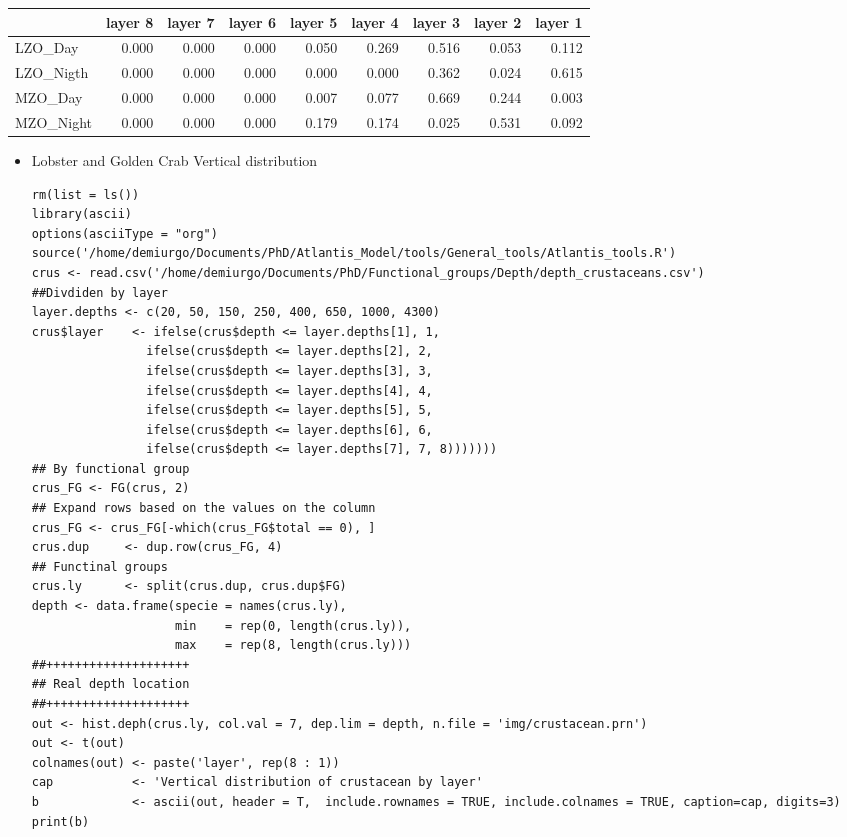 \documentclass[11pt]{article}
\begin{document}
\begin{itemize}
\begin{itemize}
\begin{itemize}
\begin{center}
\begin{tabular}{lrrrrrrrr}
            &  layer 8  &  layer 7  &  layer 6  &  layer 5  &  layer 4  &  layer 3  &  layer 2  &  layer 1  \\
\hline
 LZO_Day    &    0.000  &    0.000  &    0.000  &    0.050  &    0.269  &    0.516  &    0.053  &    0.112  \\
 LZO_Nigth  &    0.000  &    0.000  &    0.000  &    0.000  &    0.000  &    0.362  &    0.024  &    0.615  \\
 MZO_Day    &    0.000  &    0.000  &    0.000  &    0.007  &    0.077  &    0.669  &    0.244  &    0.003  \\
 MZO_Night  &    0.000  &    0.000  &    0.000  &    0.179  &    0.174  &    0.025  &    0.531  &    0.092  \\
\end{tabular}
\end{center}


\begin{itemize}
\item Lobster and Golden Crab Vertical distribution

\begin{verbatim}
rm(list = ls())
library(ascii)
options(asciiType = "org")
source('/home/demiurgo/Documents/PhD/Atlantis_Model/tools/General_tools/Atlantis_tools.R')
crus <- read.csv('/home/demiurgo/Documents/PhD/Functional_groups/Depth/depth_crustaceans.csv')
##Divdiden by layer
layer.depths <- c(20, 50, 150, 250, 400, 650, 1000, 4300)
crus$layer    <- ifelse(crus$depth <= layer.depths[1], 1,
                ifelse(crus$depth <= layer.depths[2], 2,
                ifelse(crus$depth <= layer.depths[3], 3,
                ifelse(crus$depth <= layer.depths[4], 4,
                ifelse(crus$depth <= layer.depths[5], 5,
                ifelse(crus$depth <= layer.depths[6], 6,
                ifelse(crus$depth <= layer.depths[7], 7, 8)))))))
## By functional group
crus_FG <- FG(crus, 2)
## Expand rows based on the values on the column
crus_FG <- crus_FG[-which(crus_FG$total == 0), ]
crus.dup     <- dup.row(crus_FG, 4)
## Functinal groups
crus.ly      <- split(crus.dup, crus.dup$FG)
depth <- data.frame(specie = names(crus.ly),
                    min    = rep(0, length(crus.ly)),
                    max    = rep(8, length(crus.ly)))
##++++++++++++++++++++
## Real depth location
##++++++++++++++++++++
out <- hist.deph(crus.ly, col.val = 7, dep.lim = depth, n.file = 'img/crustacean.prn')
out <- t(out)
colnames(out) <- paste('layer', rep(8 : 1))
cap           <- 'Vertical distribution of crustacean by layer'
b             <- ascii(out, header = T,  include.rownames = TRUE, include.colnames = TRUE, caption=cap, digits=3)
print(b)
\end{verbatim}


\end{itemize}
\end{itemize}
\end{itemize}
\end{itemize}
\end{document}
